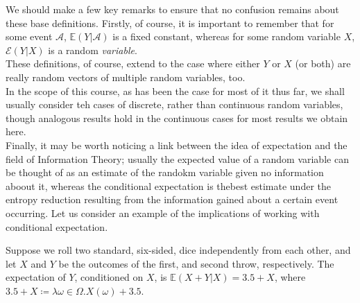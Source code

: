 	We should make a few key remarks to ensure that no confusion remains about these base 
	definitions. Firstly, of course, it is important to remember that for some event 
	$\mathcal{A}$, $\mathbb{E}(Y|\mathcal{A})$ is a fixed constant, whereas for some random 
	variable $X$, $\mathcal{E}(Y | X)$ is a random \emph{variable}. \\
	These definitions, of course, extend to the case where either $Y$ or $X$ (or both) are 
	really random vectors of multiple random variables, too.\\
	In the scope of this course, as has been the case for most of it thus far, we shall 
	usually consider teh cases of discrete, rather than continuous random variables, though 
	analogous results hold in the continuous cases for most results we obtain here. \\
	Finally, it may be worth noticing a link between the idea of expectation and the field of 
	Information Theory; usually the expected value of a random variable can be thought of as 
	an estimate of the randokm variable given no information aboout it, whereas the 
	conditional expectation is thebest estimate under the entropy reduction resulting from the 
	information gained about a certain event occurring. Let us consider an example of the 
	implications of working with conditional expectation.\par
	\begin{claim}
	Suppose we roll two standard, six-sided, dice independently from each other, and let $X$ 
	and $Y$ be the outcomes of the first, and second throw, respectively. The expectation of 
	$Y$, conditioned on $X$, is $\mathbb{E}(X+Y|X) = 3.5+X$, where $3.5 + X \coloneqq 
	\lambda \omega \in \Omega . X(\omega)+3.5$.
	\end{claim}
